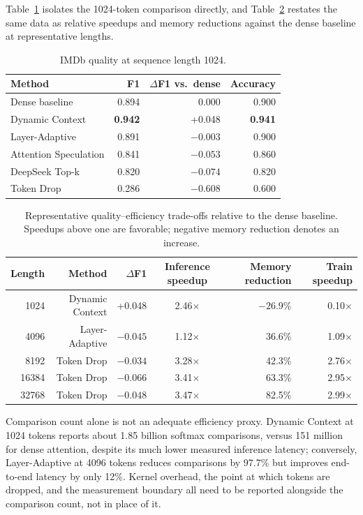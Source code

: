 \documentclass[11pt]{article}
\begin{document}
Table~\ref{tab:quality-1024} isolates the 1024-token comparison directly, and
Table~\ref{tab:tradeoffs} restates the same data as relative speedups and
memory reductions against the dense baseline at representative lengths.

\begin{table}[ht]
  \centering
  \small
  \caption{IMDb quality at sequence length 1024.}
  \label{tab:quality-1024}
  \begin{tabular}{@{}lrrr@{}}
    \toprule
    Method & F1 & $\Delta$F1 vs.\ dense & Accuracy \\
    \midrule
    Dense baseline & 0.894 & 0.000 & 0.900 \\
    Dynamic Context & \textbf{0.942} & +0.048 & \textbf{0.941} \\
    Layer-Adaptive & 0.891 & $-0.003$ & 0.900 \\
    Attention Speculation & 0.841 & $-0.053$ & 0.860 \\
    DeepSeek Top-k & 0.820 & $-0.074$ & 0.820 \\
    Token Drop & 0.286 & $-0.608$ & 0.600 \\
    \bottomrule
  \end{tabular}
\end{table}

\begin{table}[ht]
  \centering
  \small
  \caption{Representative quality--efficiency trade-offs relative to the dense
  baseline. Speedups above one are favorable; negative memory reduction denotes
  an increase.}
  \label{tab:tradeoffs}
  \begin{tabular}{@{}rrrcrr@{}}
    \toprule
    Length & Method & $\Delta$F1 & Inference speedup & Memory reduction & Train speedup \\
    \midrule
    1024  & Dynamic Context & +0.048 & 2.46$\times$ & $-26.9$\% & 0.10$\times$ \\
    4096  & Layer-Adaptive & $-0.045$ & 1.12$\times$ & 36.6\% & 1.09$\times$ \\
    8192  & Token Drop & $-0.034$ & 3.28$\times$ & 42.3\% & 2.76$\times$ \\
    16384 & Token Drop & $-0.066$ & 3.41$\times$ & 63.3\% & 2.95$\times$ \\
    32768 & Token Drop & $-0.048$ & 3.47$\times$ & 82.5\% & 2.99$\times$ \\
    \bottomrule
  \end{tabular}
\end{table}

Comparison count alone is not an adequate efficiency proxy. Dynamic Context at
1024 tokens reports about 1.85 billion softmax comparisons, versus 151 million
for dense attention, despite its much lower measured inference latency;
conversely, Layer-Adaptive at 4096 tokens reduces comparisons by 97.7\% but
improves end-to-end latency by only 12\%. Kernel overhead, the point at which
tokens are dropped, and the measurement boundary all need to be reported
alongside the comparison count, not in place of it.
\end{document}
